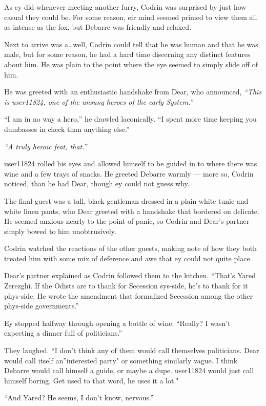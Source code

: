 As ey did whenever meeting another furry, Codrin was surprised by just how casual they could be. For some reason, eir mind seemed primed to view them all as intense as the fox, but Debarre was friendly and relaxed.

Next to arrive was a\ldots well, Codrin could tell that he was human and that he was male, but for some reason, he had a hard time discerning any distinct features about him. He was plain to the point where the eye seemed to simply slide off of him.

He was greeted with an enthusiastic handshake from Dear, who announced, \emph{``This is user11824, one of the unsung heroes of the early System.''}

``I am in no way a hero,'' he drawled laconically. ``I spent more time keeping you dumbasses in check than anything else.''

\emph{``A truly heroic feat, that.''}

user11824 rolled his eyes and allowed himself to be guided in to where there was wine and a few trays of snacks. He greeted Debarre warmly — more so, Codrin noticed, than he had Dear, though ey could not guess why.

The final guest was a tall, black gentleman dressed in a plain white tunic and white linen pants, who Dear greeted with a handshake that bordered on delicate. He seemed anxious nearly to the point of panic, so Codrin and Dear's partner simply bowed to him unobtrusively.

Codrin watched the reactions of the other guests, making note of how they both treated him with some mix of deference and awe that ey could not quite place.

Dear's partner explained as Codrin followed them to the kitchen. ``That's Yared Zerezghi. If the Odists are to thank for Secession sys-side, he's to thank for it phys-side. He wrote the amendment that formalized Secession among the other phys-side governments.''

Ey stopped halfway through opening a bottle of wine. ``Really? I wasn't expecting a dinner full of politicians.''

They laughed. ``I don't think any of them would call themselves politicians. Dear would call itself an''interested party" or something similarly vague. I think Debarre would call himself a guide, or maybe a dupe. user11824 would just call himself boring. Get used to that word, he uses it a lot."

``And Yared? He seems, I don't know, nervous.''

